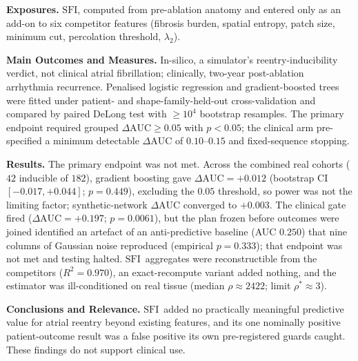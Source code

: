 \documentclass[11pt]{article}
\newcommand{\lam}{\lambda}
\newcommand{\rhoval}{\rho}
\newcommand{\SFI}{\ensuremath{\mathrm{SFI}}}
\newcommand{\dAUC}{\ensuremath{\Delta\mathrm{AUC}}}
\begin{document}
\medskip
\noindent\textbf{Exposures.} \SFI, computed from pre-ablation anatomy and
entered only as an add-on to six competitor features (fibrosis burden, spatial
entropy, patch size, minimum cut, percolation threshold, $\lam_2$).

\medskip
\noindent\textbf{Main Outcomes and Measures.} In-silico, a simulator's
reentry-inducibility verdict, not clinical atrial fibrillation; clinically,
two-year post-ablation arrhythmia recurrence. Penalised logistic regression and
gradient-boosted trees were fitted under patient- and shape-family-held-out
cross-validation and compared by paired DeLong test with $\geq10^{4}$ bootstrap
resamples. The primary endpoint required grouped $\dAUC\geq0.05$ with $p<0.05$;
the clinical arm pre-specified a minimum detectable $\dAUC$ of $0.10$--$0.15$
and fixed-sequence stopping.

\medskip
\noindent\textbf{Results.} The primary endpoint was not met. Across the combined
real cohorts ($42$ inducible of $182$), gradient boosting gave $\dAUC=+0.012$
(bootstrap CI $[-0.017,+0.044]$; $p=0.449$), excluding the $0.05$ threshold, so
power was not the limiting factor; synthetic-network $\dAUC$ converged to
$+0.003$. The clinical gate fired ($\dAUC=+0.197$; $p=0.0061$), but the plan
frozen before outcomes were joined identified an artefact of an anti-predictive
baseline (AUC $0.250$) that nine columns of Gaussian noise reproduced (empirical
$p=0.333$); that endpoint was not met and testing halted. \SFI\ aggregates were
reconstructible from the competitors ($R^{2}=0.970$), an exact-recompute variant
added nothing, and the estimator was ill-conditioned on real tissue (median
$\rhoval\approx2422$; limit $\rhoval^{\ast}\approx3$).

\medskip
\noindent\textbf{Conclusions and Relevance.} \SFI\ added no practically
meaningful predictive value for atrial reentry beyond existing features, and its
one nominally positive patient-outcome result was a false positive its own
pre-registered guards caught. These findings do not support clinical use.

\newpage

\end{document}

